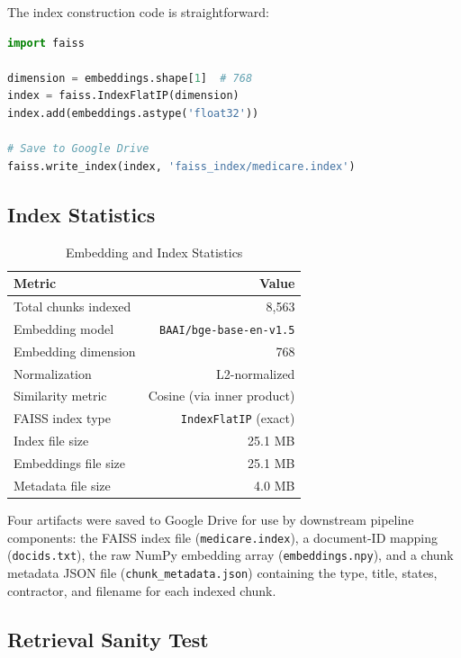 \documentclass[12pt, letterpaper]{article}
\begin{document}
The index construction code is straightforward:

\begin{lstlisting}[language=Python, caption=Building and saving the FAISS index]
import faiss

dimension = embeddings.shape[1]  # 768
index = faiss.IndexFlatIP(dimension)
index.add(embeddings.astype('float32'))

# Save to Google Drive
faiss.write_index(index, 'faiss_index/medicare.index')
\end{lstlisting}

\subsection{Index Statistics}

\begin{table}[h]
\centering
\caption{Embedding and Index Statistics}
\label{tab:indexstats}
\begin{tabular}{@{}lr@{}}
\toprule
\textbf{Metric} & \textbf{Value} \\
\midrule
Total chunks indexed        & 8,563 \\
Embedding model             & \texttt{BAAI/bge-base-en-v1.5} \\
Embedding dimension         & 768 \\
Normalization               & L2-normalized \\
Similarity metric           & Cosine (via inner product) \\
FAISS index type            & \texttt{IndexFlatIP} (exact) \\
Index file size             & 25.1 MB \\
Embeddings file size        & 25.1 MB \\
Metadata file size          & 4.0 MB \\
\bottomrule
\end{tabular}
\end{table}

Four artifacts were saved to Google Drive for use by downstream pipeline components:
the FAISS index file (\texttt{medicare.index}), a document-ID mapping
(\texttt{docids.txt}), the raw NumPy embedding array (\texttt{embeddings.npy}), and
a chunk metadata JSON file (\texttt{chunk\_metadata.json}) containing the type, title,
states, contractor, and filename for each indexed chunk.

\subsection{Retrieval Sanity Test}
\end{document}
